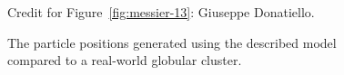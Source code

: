 \begin{figure}[htp]
    \vspace{0.5em}
    {\footnotesize
        Credit for Figure~\ref{fig:messier-13}: Giuseppe Donatiello. \par}

    \caption{The particle positions generated using the described model compared to a real-world globular cluster.}
    \label{fig:globular-cluster-gen-vs-real}
\end{figure}